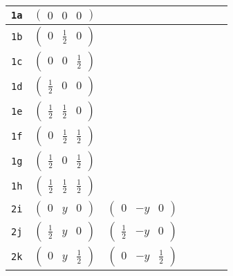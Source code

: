 \documentclass[fleqn,9pt,landscape]{jsarticle}
\begin{document}
\begin{center}
\begin{longtable}{ccccccc}
{\tt 1a} & $ \begin{pmatrix} 0 & 0 & 0 \end{pmatrix} $ & $  $ & $  $ & $  $ \\ \hline
{\tt 1b} & $ \begin{pmatrix} 0 & \frac{1}{2} & 0 \end{pmatrix} $ & $  $ & $  $ & $  $ \\ \hline
{\tt 1c} & $ \begin{pmatrix} 0 & 0 & \frac{1}{2} \end{pmatrix} $ & $  $ & $  $ & $  $ \\ \hline
{\tt 1d} & $ \begin{pmatrix} \frac{1}{2} & 0 & 0 \end{pmatrix} $ & $  $ & $  $ & $  $ \\ \hline
{\tt 1e} & $ \begin{pmatrix} \frac{1}{2} & \frac{1}{2} & 0 \end{pmatrix} $ & $  $ & $  $ & $  $ \\ \hline
{\tt 1f} & $ \begin{pmatrix} 0 & \frac{1}{2} & \frac{1}{2} \end{pmatrix} $ & $  $ & $  $ & $  $ \\ \hline
{\tt 1g} & $ \begin{pmatrix} \frac{1}{2} & 0 & \frac{1}{2} \end{pmatrix} $ & $  $ & $  $ & $  $ \\ \hline
{\tt 1h} & $ \begin{pmatrix} \frac{1}{2} & \frac{1}{2} & \frac{1}{2} \end{pmatrix} $ & $  $ & $  $ & $  $ \\ \hline
{\tt 2i} & $ \begin{pmatrix} 0 & y & 0 \end{pmatrix} $ & $ \begin{pmatrix} 0 & - y & 0 \end{pmatrix} $ & $  $ & $  $ \\ \hline
{\tt 2j} & $ \begin{pmatrix} \frac{1}{2} & y & 0 \end{pmatrix} $ & $ \begin{pmatrix} \frac{1}{2} & - y & 0 \end{pmatrix} $ & $  $ & $  $ \\ \hline
{\tt 2k} & $ \begin{pmatrix} 0 & y & \frac{1}{2} \end{pmatrix} $ & $ \begin{pmatrix} 0 & - y & \frac{1}{2} \end{pmatrix} $ & $  $ & $  $ \\ \hline

\end{longtable}
\end{center}
\end{document}
